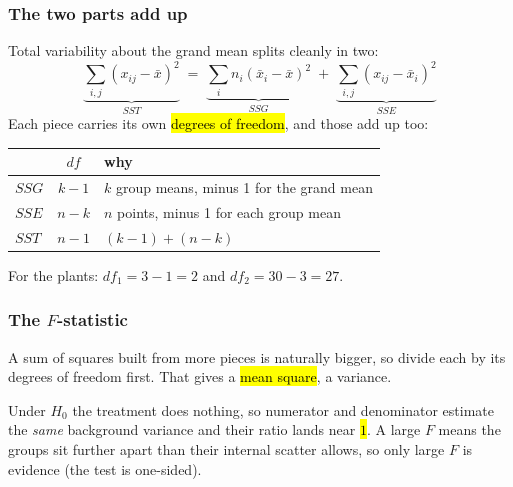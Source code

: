 \documentclass[slidestop,compress,mathserif]{beamer}
\begin{document}
\begin{frame}
\frametitle{The two parts add up}

Total variability about the grand mean splits cleanly in two:
\[
\underbrace{\sum_{i,j} (x_{ij} - \bar{x})^2}_{SST}
\;=\;
\underbrace{\sum_i n_i (\bar{x}_i - \bar{x})^2}_{SSG}
\;+\;
\underbrace{\sum_{i,j} (x_{ij} - \bar{x}_i)^2}_{SSE}
\]
\pause
\vspace{0.3em}
Each piece carries its own \hl{degrees of freedom}, and those add up too:

\vspace{0.2em}
\begin{center}
{\small
\begin{tabular}{lcl}
\toprule
 & $df$ & why \\
\midrule
$SSG$ & $k - 1$ & $k$ group means, minus 1 for the grand mean \\
$SSE$ & $n - k$ & $n$ points, minus 1 for each group mean \\
\midrule
$SST$ & $n - 1$ & $(k-1) + (n-k)$ \\
\bottomrule
\end{tabular}}
\end{center}

\pause
\vspace{0.2em}
{\small For the plants: $df_1 = 3 - 1 = 2$ and $df_2 = 30 - 3 = 27$.}

\end{frame}


\begin{frame}
\frametitle{The $F$-statistic}

A sum of squares built from more pieces is naturally bigger, so divide each by its degrees of freedom first. That gives a \hl{mean square}, a variance.


\pause
{\small Under $H_0$ the treatment does nothing, so numerator and denominator estimate the \emph{same} background variance and their ratio lands near \hl{$1$}. A large $F$ means the groups sit further apart than their internal scatter allows, so only large $F$ is evidence (the test is one-sided).}

\end{frame}
\end{document}
